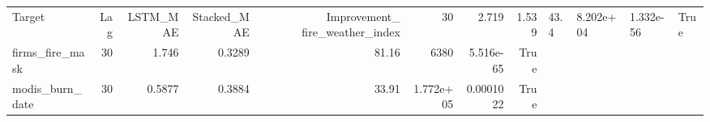 \begin{tabular}{lrrrrrrr}
\toprule
Target & Lag & LSTM_MAE & Stacked_MAE & Improvement_%
\midrule
fire_weather_index & 30 & 2.719 & 1.539 & 43.4 & 8.202e+04 & 1.332e-56 & True \\
firms_fire_mask & 30 & 1.746 & 0.3289 & 81.16 & 6380 & 5.516e-65 & True \\
modis_burn_date & 30 & 0.5877 & 0.3884 & 33.91 & 1.772e+05 & 0.0001022 & True \\
\bottomrule
\end{tabular}
